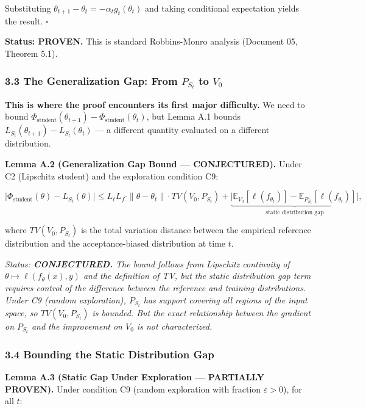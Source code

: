 \documentclass[
  12pt,
]{ctexart}
\begin{document}
Substituting \(\theta_{t+1} - \theta_t = -\alpha_t g_t(\theta_t)\) and
taking conditional expectation yields the result. \(\square\)

\textbf{Status: PROVEN.} This is standard Robbins-Monro analysis
(Document 05, Theorem 5.1).

\subsubsection{\texorpdfstring{3.3 The Generalization Gap: From
\(P_{S_t}\) to
\(V_0\)}{3.3 The Generalization Gap: From P\_\{S\_t\} to V\_0}}\label{the-generalization-gap-from-p_s_t-to-v_0}

\textbf{This is where the proof encounters its first major difficulty.}
We need to bound
\(\Phi_{\text{student}}(\theta_{t+1}) - \Phi_{\text{student}}(\theta_t)\),
but Lemma A.1 bounds \(L_{S_t}(\theta_{t+1}) - L_{S_t}(\theta_t)\) --- a
different quantity evaluated on a different distribution.

\textbf{Lemma A.2 (Generalization Gap Bound --- CONJECTURED).} Under C2
(Lipschitz student) and the exploration condition C9:

\[\bigl|\Phi_{\text{student}}(\theta) - L_{S_t}(\theta)\bigr| \leq L_\ell L_f \cdot \|\theta - \theta_t\| \cdot TV(V_0, P_{S_t}) + \underbrace{\bigl|\mathbb{E}_{V_0}[\ell(f_{\theta_t})] - \mathbb{E}_{P_{S_t}}[\ell(f_{\theta_t})]\bigr|}_{\text{static distribution gap}},\]

where \(TV(V_0, P_{S_t})\) is the total variation distance between the
empirical reference distribution and the acceptance-biased distribution
at time \(t\).

\emph{Status: \textbf{CONJECTURED.} The bound follows from Lipschitz
continuity of \(\theta \mapsto \ell(f_\theta(x), y)\) and the definition
of TV, but the static distribution gap term requires control of the
difference between the reference and training distributions. Under C9
(random exploration), \(P_{S_t}\) has support covering all regions of
the input space, so \(TV(V_0, P_{S_t})\) is bounded. But the exact
relationship between the gradient on \(P_{S_t}\) and the improvement on
\(V_0\) is not characterized.}

\subsubsection{3.4 Bounding the Static Distribution
Gap}\label{bounding-the-static-distribution-gap}

\textbf{Lemma A.3 (Static Gap Under Exploration --- PARTIALLY PROVEN).}
Under condition C9 (random exploration with fraction
\(\varepsilon > 0\)), for all \(t\):
\end{document}
